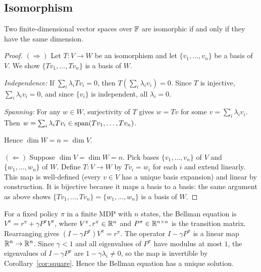 \documentclass[11pt,a4paper]{article}
\begin{document}
\subsection{Isomorphism}

\begin{proposition}
\label{prop:isomorphism}
Two finite-dimensional vector spaces over $\mathbb{F}$ are isomorphic if and only if
they have the same dimension.
\end{proposition}

\begin{proof}
$(\Rightarrow)$\; Let $T\colon V \to W$ be an isomorphism and let
$\{v_1, \ldots, v_n\}$ be a basis of $V$.  We show
$\{Tv_1, \ldots, Tv_n\}$ is a basis of $W$.

\emph{Independence:}\; If $\sum_i \lambda_i Tv_i = 0$, then
$T(\sum_i \lambda_i v_i) = 0$.  Since $T$ is injective,
$\sum_i \lambda_i v_i = 0$, and since $\{v_i\}$ is independent,
all $\lambda_i = 0$.

\emph{Spanning:}\; For any $w \in W$, surjectivity of $T$ gives $w = Tv$
for some $v = \sum_i \lambda_i v_i$.  Then
$w = \sum_i \lambda_i Tv_i \in \operatorname{span}(Tv_1, \ldots, Tv_n)$.

Hence $\dim W = n = \dim V$.

$(\Leftarrow)$\; Suppose $\dim V = \dim W = n$.  Pick bases
$\{v_1, \ldots, v_n\}$ of $V$ and $\{w_1, \ldots, w_n\}$ of $W$.
Define $T\colon V \to W$ by $Tv_i = w_i$ for each $i$ and extend linearly.
This map is well-defined (every $v \in V$ has a unique basis expansion) and
linear by construction.  It is bijective because it maps a basis to a basis:
the same argument as above shows $\{Tv_1, \ldots, Tv_n\} = \{w_1, \ldots, w_n\}$
is a basis of $W$.
\end{proof}

\begin{rlconnection}[title={Bellman Equation as a Linear System}]
For a fixed policy $\pi$ in a finite MDP with $n$ states, the Bellman
equation is $V^\pi = r^\pi + \gamma P^\pi V^\pi$, where
$V^\pi, r^\pi \in \mathbb{R}^n$ and $P^\pi \in \mathbb{R}^{n \times n}$ is the transition
matrix.  Rearranging gives $(I - \gamma P^\pi) V^\pi = r^\pi$.  The
operator $I - \gamma P^\pi$ is a linear map $\mathbb{R}^n \to \mathbb{R}^n$.  Since
$\gamma < 1$ and all eigenvalues of $P^\pi$ have modulus at most $1$, the
eigenvalues of $I - \gamma P^\pi$ are $1 - \gamma \lambda_i \neq 0$, so
the map is invertible by Corollary~\ref{cor:square}.  Hence the Bellman
equation has a unique solution.
\end{rlconnection}
\end{document}
